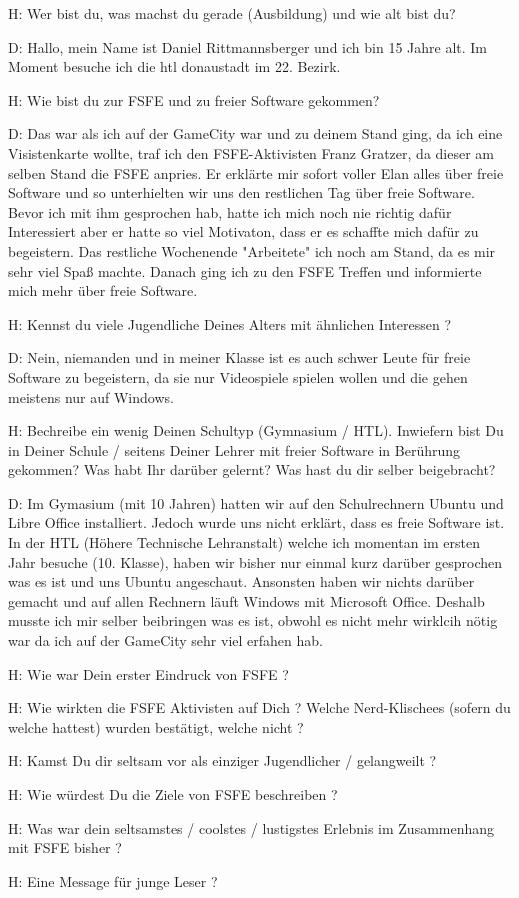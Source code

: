 H: Wer bist du, was machst du gerade (Ausbildung) und wie alt bist du?


D: Hallo, mein Name ist Daniel Rittmannsberger und ich bin 15 Jahre alt. Im Moment besuche ich die htl donaustadt im 22. Bezirk.





H: Wie bist du zur FSFE und zu freier Software gekommen?


D: Das war als ich auf der GameCity war und zu deinem Stand ging, da ich eine Visistenkarte wollte, traf ich den FSFE-Aktivisten
   Franz Gratzer, da dieser am selben Stand die FSFE anpries. Er erklärte mir sofort voller Elan alles über freie Software und so
   unterhielten wir uns den restlichen Tag über freie Software. Bevor ich mit ihm gesprochen hab, hatte ich mich noch nie
   richtig dafür Interessiert aber er hatte so viel Motivaton, dass er es schaffte mich dafür zu begeistern. Das restliche
   Wochenende "Arbeitete" ich noch am Stand, da es mir sehr viel Spaß machte. Danach ging ich zu den FSFE Treffen und
   informierte mich mehr über freie Software.





H: Kennst du viele Jugendliche Deines Alters mit ähnlichen Interessen ?


D: Nein, niemanden und in meiner Klasse ist es auch schwer Leute für freie Software zu begeistern, da sie nur Videospiele
   spielen wollen und die gehen meistens nur auf Windows.





H: Bechreibe ein wenig Deinen Schultyp (Gymnasium / HTL). Inwiefern bist Du in Deiner Schule / seitens Deiner Lehrer 
   mit freier Software in Berührung gekommen? Was habt Ihr darüber gelernt? Was hast du dir selber beigebracht?


D: Im Gymasium (mit 10 Jahren) hatten wir auf den Schulrechnern Ubuntu und Libre Office installiert. Jedoch wurde uns nicht
   erklärt, dass es freie Software ist.
   In der HTL (Höhere Technische Lehranstalt) welche ich momentan im ersten Jahr besuche (10. Klasse), haben wir bisher nur
   einmal kurz darüber gesprochen was es ist und uns Ubuntu angeschaut. Ansonsten haben wir nichts darüber gemacht und auf
   allen Rechnern läuft Windows mit Microsoft Office. Deshalb musste ich mir selber beibringen was es ist, obwohl es nicht
   mehr wirklcih nötig war da ich auf der GameCity sehr viel erfahen hab.





H: Wie war Dein erster Eindruck von FSFE ?



H: Wie wirkten die FSFE Aktivisten auf Dich ? Welche Nerd-Klischees (sofern du welche hattest) wurden bestätigt, 
   welche nicht ?


H: Kamst Du dir seltsam vor als einziger Jugendlicher / gelangweilt ?


H: Wie würdest Du die Ziele von FSFE beschreiben ?


H: Was war dein seltsamstes / coolstes / lustigstes Erlebnis im Zusammenhang mit FSFE bisher ?


H: Eine Message für junge Leser ?


